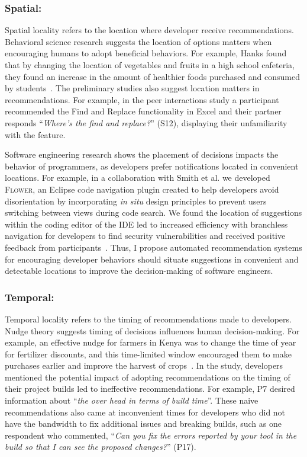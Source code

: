 \subsubsection{Spatial:} Spatial locality refers to the location where developer receive recommendations. Behavioral science research suggests the location of options matters when encouraging humans to adopt beneficial behaviors. For example, Hanks found that by changing the location of vegetables and fruits in a high school cafeteria, they found an increase in the amount of healthier foods purchased and consumed by students~\cite{Hanks2012Lunchroom}. The preliminary studies also suggest location matters in recommendations. For example, in the peer interactions study a participant recommended the Find and Replace functionality in Excel and their partner responds ``\textit{Where's the find and replace?}'' (S12), displaying their unfamiliarity with the feature. 

Software engineering research shows the placement of decisions impacts the behavior of programmers, as developers prefer notifications located in convenient locations. For example, in a collaboration with Smith et al. we developed \textsc{Flower}, an Eclipse code navigation plugin created to help developers avoid disorientation by incorporating \textit{in situ} design principles to prevent users switching between views during code search. We found the location of suggestions within the coding editor of the IDE led to increased efficiency with branchless navigation for developers to find security vulnerabilities and received positive feedback from participants~\cite{Flower}. Thus, I propose automated recommendation systems for encouraging developer behaviors should situate suggestions in convenient and detectable locations to improve the decision-making of software engineers.

\subsubsection{Temporal:} Temporal locality refers to the timing of recommendations made to developers. Nudge theory suggests timing of decisions influences human decision-making. For example, an effective nudge for farmers in Kenya was to change the time of year for fertilizer discounts, and this time-limited window encouraged them to make purchases earlier and improve the harvest of crops~\cite{duflo2011nudging}. In the \tele study, developers mentioned the potential impact of adopting \toolone recommendations on the timing of their project builds led to ineffective recommendations. For example, P7 desired information about ``\textit{the over head in terms of build time}''. These naive recommendations also came at inconvenient times for developers who did not have the bandwidth to fix additional issues and breaking builds, such as one respondent who commented, ``\textit{Can you fix the errors reported by your tool in the build so that I can see the proposed changes?}'' (P17).

